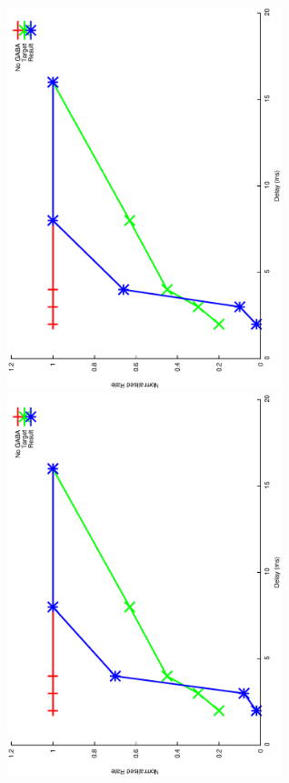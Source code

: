 \documentclass{article}
\begin{document}
\includegraphics[keepaspectratio=true,angle=-90,width=0.6\textwidth]{DS_ClickRecovery_result.39.eps}\clearpage
\includegraphics[keepaspectratio=true,angle=-90,width=0.6\textwidth]{DS_ClickRecovery_result.40.eps}\clearpage




% 
\end{document}
